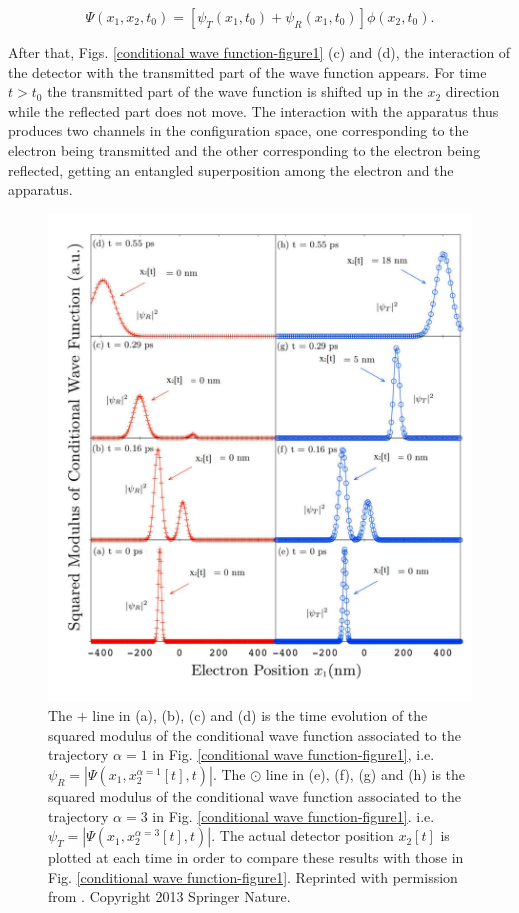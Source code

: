 \documentclass[nofootinbib, secnumarabic, amsmath, nobibnotes,10pt,aps,pra]{revtex4-1}
\newcommand{\fref}[1]{Fig. \ref{#1}}
\begin{document}
\begin{equation}
\Psi(x_1,x_2,t_0) = \left[\psi_{T}(x_1,t_0)+\psi_{R}(x_1,t_0)\right]\phi(x_2,t_0).
\end{equation}

After that, Figs. \ref{conditional wave function-figure1} (c) and (d), the
interaction of the detector with the transmitted part of the wave function appears. For time $t>t_0$ the transmitted part of the wave
function is shifted up in the $x_2$ direction while the reflected part does not move. The interaction with the apparatus thus produces 
two channels in the configuration space, one corresponding to the electron being transmitted and the other corresponding to the electron being
reflected, getting an entangled superposition among the electron and the apparatus.

\begin{figure}
\centering
\includegraphics[width=0.57\columnwidth]{F1_13.pdf}
\caption{ The $+$ line in (a), (b), (c) and (d) is the time evolution of the squared modulus of the conditional wave function associated to the trajectory $\alpha = 1$ in \fref{conditional wave function-figure1}, i.e. $\psi_{R} = |\Psi(x_1,x_2^{\alpha=1}[t],t)|$. The $\odot$ line in (e), (f), (g) and (h) is the squared modulus of the conditional wave function associated to the trajectory $\alpha = 3$ in \fref{conditional wave function-figure1}. i.e. $\psi_{T} = |\Psi(x_1,x_2^{\alpha=3}[t],t)|$. The actual detector position $x_2[t]$ is plotted at each time in order to compare these results with those in \fref{conditional wave function-figure1}. Reprinted with permission from \cite{om.albareda}. Copyright 2013 Springer Nature.}
\label{conditional wave function-figure2}
\end{figure}
\end{document}
